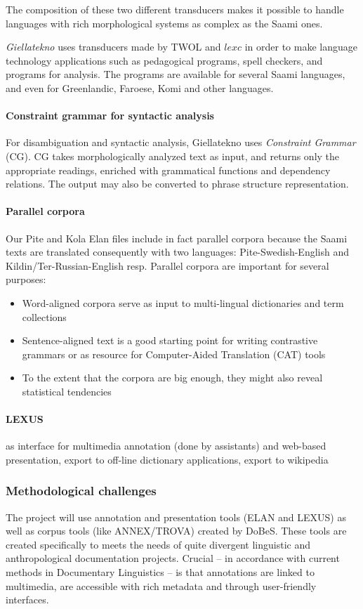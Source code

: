 \documentclass[a4paper,12pt]{article}
\begin{document}
The composition of these two different transducers makes it possible to handle languages with rich morphological systems as complex as the Saami ones. 

\textit{Giellatekno} uses transducers made by TWOL and $lexc$ in order to make language technology applications such as pedagogical programs, spell checkers, and programs for analysis. The programs are available for several Saami languages, and even for Greenlandic, Faroese, Komi and other languages.

\paragraph{Constraint grammar for syntactic analysis}
For disambiguation and syntactic analysis, Giellatekno uses \textit{Constraint Grammar} (CG). CG takes morphologically analyzed text as input, and returns only the appropriate readings, enriched with grammatical functions and dependency relations. The output may also be converted to phrase structure representation.

\paragraph{Parallel corpora}
Our Pite and Kola Elan files include in fact parallel corpora because the Saami texts are translated consequently with two languages: Pite-Swedish-English and Kildin/Ter-Russian-English resp. Parallel corpora are important for several purposes:
\begin{itemize}
\item Word-aligned corpora serve as input to multi-lingual dictionaries and term collections
\item Sentence-aligned text is a good starting point for writing contrastive grammars or as resource for
Computer-Aided Translation (CAT) tools 
\item To the extent that the corpora are big enough, they might also reveal statistical tendencies
\end{itemize}

\paragraph{LEXUS} as interface for multimedia annotation (done by assistants) and web-based presentation, export to off-line dictionary applications, export to wikipedia

\subsubsection{Methodological challenges}%
The project will use annotation and presentation tools (ELAN and LEXUS) as well as corpus tools (like ANNEX/TROVA) created by DoBeS. These tools are created specifically to meets the needs of quite divergent linguistic and anthropological documentation projects. Crucial – in accordance with current methods in Documentary Linguistics – is that annotations are linked to multimedia, are accessible with rich metadata and through user-friendly interfaces.
\end{document}
